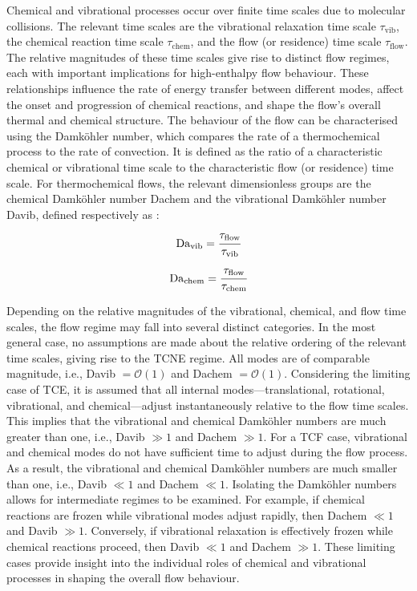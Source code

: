 Chemical and vibrational processes occur over finite time scales due to molecular collisions. The relevant time scales are the vibrational relaxation time scale $\tau_{\mathrm{vib}}$, the chemical reaction time scale $\tau_{\mathrm{chem}}$, and the flow (or residence) time scale $\tau_{\mathrm{flow}}$. The relative magnitudes of these time scales give rise to distinct flow regimes, each with important implications for high-enthalpy flow behaviour. These relationships influence the rate of energy transfer between different modes, affect the onset and progression of chemical reactions, and shape the flow's overall thermal and chemical structure. The behaviour of the flow can be characterised using the Damköhler number, which compares the rate of a thermochemical process to the rate of convection. It is defined as the ratio of a characteristic chemical or vibrational time scale to the characteristic flow (or residence) time scale. For thermochemical flows, the relevant dimensionless groups are the chemical Damköhler number \gls{Dachem} and the vibrational Damköhler number \gls{Davib}, defined respectively as \citep{miromiroThesis}: \begin{equation}\label{equation:davib}
    \mathrm{Da}_{\mathrm{vib}} = \cfrac{\tau_{\mathrm{flow}}}{\tau_{\mathrm{vib}}}
\end{equation} \begin{equation}\label{equation:dachem}
    \mathrm{Da}_{\mathrm{chem}} = \cfrac{\tau_{\mathrm{flow}}}{\tau_{\mathrm{chem}}}
\end{equation} 

Depending on the relative magnitudes of the vibrational, chemical, and flow time scales, the flow regime may fall into several distinct categories. In the most general case, no assumptions are made about the relative ordering of the relevant time scales, giving rise to the \gls{TCNE} regime. All modes are of comparable magnitude, i.e., \gls{Davib} $= \mathcal{O}(1)$ and \gls{Dachem} $= \mathcal{O}(1)$. Considering the limiting case of \gls{TCE}, it is assumed that all internal modes—translational, rotational, vibrational, and chemical—adjust instantaneously relative to the flow time scales. This implies that the vibrational and chemical Damköhler numbers are much greater than one, i.e., \gls{Davib} $\gg 1$ and \gls{Dachem} $\gg 1$. For a \gls{TCF} case, vibrational and chemical modes do not have sufficient time to adjust during the flow process. As a result, the vibrational and chemical Damköhler numbers are much smaller than one, i.e., \gls{Davib} $\ll 1$ and \gls{Dachem} $\ll 1$. Isolating the Damköhler numbers allows for intermediate regimes to be examined. For example, if chemical reactions are frozen while vibrational modes adjust rapidly, then \gls{Dachem} $\ll 1$ and \gls{Davib} $\gg 1$. Conversely, if vibrational relaxation is effectively frozen while chemical reactions proceed, then \gls{Davib} $\ll 1$ and \gls{Dachem} $\gg 1$. These limiting cases provide insight into the individual roles of chemical and vibrational processes in shaping the overall flow behaviour.

